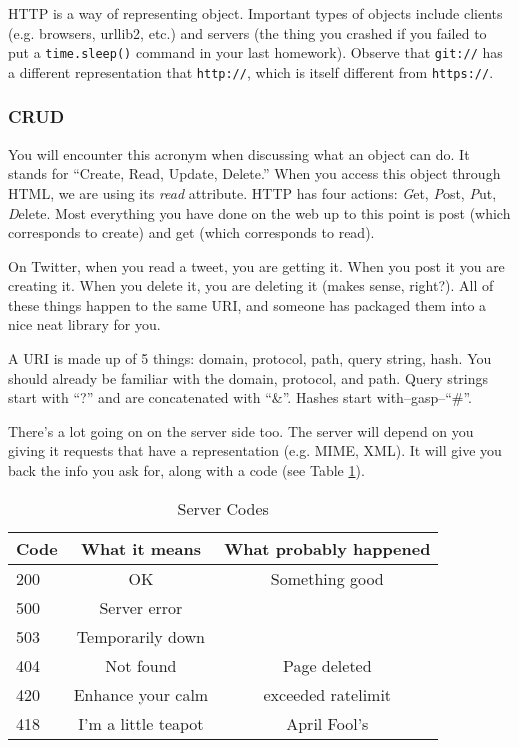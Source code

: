 \documentclass[12pt,letter]{article}
\begin{document}
HTTP is a way of representing object. Important types of objects
include clients (e.g. browsers, urllib2, etc.) and servers (the thing
you crashed if you failed to put a \texttt{time.sleep()} command in
your last homework). Observe that \texttt{git://} has a different
representation that \texttt{http://}, which is itself different from
\texttt{https://}. 

\subsubsection{CRUD}
You will encounter this acronym when discussing what an object can
do. It stands for ``Create, Read, Update, Delete.'' When you access
this object through HTML, we are using its \emph{read} attribute. HTTP
has four actions: \emph{G}et, \emph{P}ost, \emph{P}ut,
\emph{D}elete. Most everything you have done on the web up to this
point is post (which corresponds to create) and get (which corresponds
to read).

On Twitter, when you read a tweet, you are getting it. When you post
it you are creating it. When you delete
it, you are deleting it (makes sense, right?). All of these things
happen to the same URI, and someone has packaged them into a nice neat
library for you. 

A URI is made up of 5 things: domain, protocol, path, query string,
hash. You should already be familiar with the domain, protocol, and path. Query strings start with ``?'' and are concatenated with
``\&''. Hashes start with--gasp--``\#''. 

There's a lot going on on the server side too. The server will depend
on you giving it requests that have a representation (e.g. MIME,
XML). It will give you back the info you ask for, along with a code
(see Table \ref{server_codes}).

\begin{table}
\begin{center}
\caption{Server Codes}
\label{server_codes}
\begin{tabular}{lcc}
Code & What it means & What probably happened \\
\hline
200 & OK & Something good \\
500 & Server error & \\
503 & Temporarily down & \\
404 & Not found & Page deleted \\
420 & Enhance your calm & exceeded ratelimit \\
418 & I'm a little teapot & April Fool's \\
\hline
\end{tabular}
\end{center}
\end{table}
\end{document}
